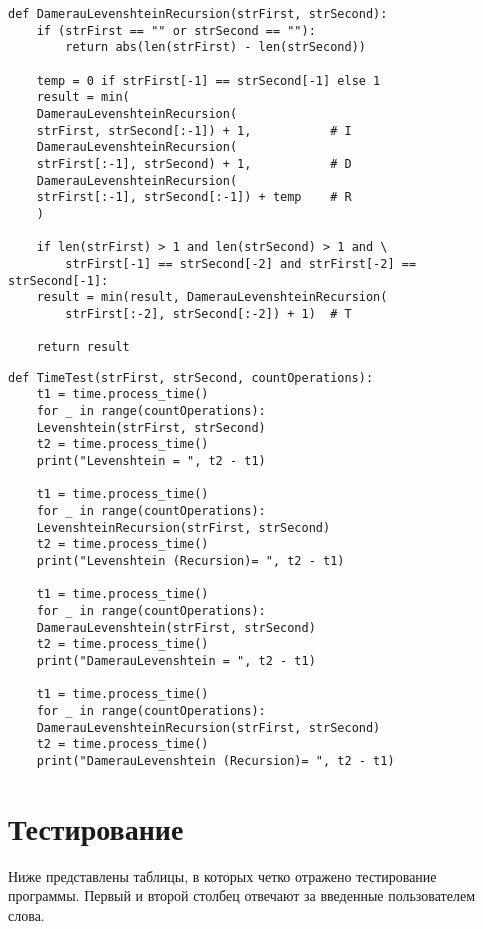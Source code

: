 \begin{lstlisting}[label=some-code,caption=Рекурсивная функция нахождения расстояния Дамерау-Левенштейна]
def DamerauLevenshteinRecursion(strFirst, strSecond):
	if (strFirst == "" or strSecond == ""):
		return abs(len(strFirst) - len(strSecond))
	
	temp = 0 if strFirst[-1] == strSecond[-1] else 1
	result = min(
	DamerauLevenshteinRecursion(
	strFirst, strSecond[:-1]) + 1,           # I
	DamerauLevenshteinRecursion(
	strFirst[:-1], strSecond) + 1,           # D
	DamerauLevenshteinRecursion(
	strFirst[:-1], strSecond[:-1]) + temp    # R
	)
	
	if len(strFirst) > 1 and len(strSecond) > 1 and \
		strFirst[-1] == strSecond[-2] and strFirst[-2] == strSecond[-1]:
	result = min(result, DamerauLevenshteinRecursion(
		strFirst[:-2], strSecond[:-2]) + 1)  # T
	
	return result
\end{lstlisting}

\begin{lstlisting}[label=some-code,caption=функция замера времени]
def TimeTest(strFirst, strSecond, countOperations):
	t1 = time.process_time()
	for _ in range(countOperations):
	Levenshtein(strFirst, strSecond)
	t2 = time.process_time()
	print("Levenshtein = ", t2 - t1)
	
	t1 = time.process_time()
	for _ in range(countOperations):
	LevenshteinRecursion(strFirst, strSecond)
	t2 = time.process_time()
	print("Levenshtein (Recursion)= ", t2 - t1)
	
	t1 = time.process_time()
	for _ in range(countOperations):
	DamerauLevenshtein(strFirst, strSecond)
	t2 = time.process_time()
	print("DamerauLevenshtein = ", t2 - t1)
	
	t1 = time.process_time()
	for _ in range(countOperations):
	DamerauLevenshteinRecursion(strFirst, strSecond)
	t2 = time.process_time()
	print("DamerauLevenshtein (Recursion)= ", t2 - t1)
\end{lstlisting}


\section{Тестирование}

Ниже представлены таблицы, в которых четко отражено тестирование программы. Первый и второй столбец отвечают за введенные пользователем слова.\\

